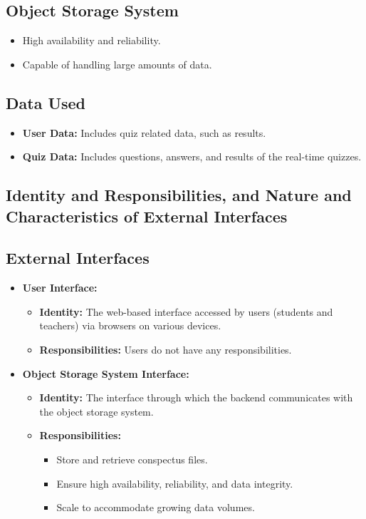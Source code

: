 \subsection*{Object Storage System}
\begin{itemize}
    \item High availability and reliability.
    \item Capable of handling large amounts of data.
\end{itemize}

\subsection*{Data Used}
\begin{itemize}
    \item \textbf{User Data:} Includes quiz related data, such as results.
    \item \textbf{Quiz Data:} Includes questions, answers, and results of the real-time quizzes.
\end{itemize}


\subsection{Identity and Responsibilities, and Nature and Characteristics of External Interfaces}

\subsection*{External Interfaces}
\begin{itemize}
    \item \textbf{User Interface:}
          \begin{itemize}
              \item \textbf{Identity:} The web-based interface accessed by users (students and teachers) via browsers on various devices.
              \item \textbf{Responsibilities:}
                    Users do not have any responsibilities.
          \end{itemize}
    \item \textbf{Object Storage System Interface:}
          \begin{itemize}
              \item \textbf{Identity:} The interface through which the backend communicates with the object storage system.
              \item \textbf{Responsibilities:}
                    \begin{itemize}
                        \item Store and retrieve conspectus files.
                        \item Ensure high availability, reliability, and data integrity.
                        \item Scale to accommodate growing data volumes.
                    \end{itemize}
          \end{itemize}
\end{itemize}

